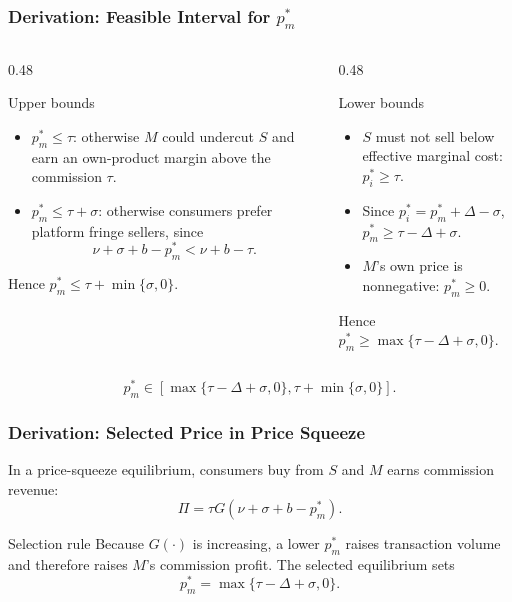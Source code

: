 \begin{frame}
  \frametitle{Derivation: Feasible Interval for $p_m^*$}
  \hypertarget{dual_pm_interval_deriv}{}
  \scriptsize

  \begin{columns}[T,onlytextwidth]
    \begin{column}{0.48\textwidth}
      \begin{block}{Upper bounds}
        \begin{itemize}
          \item $p_m^*\leq\tau$: otherwise $M$ could undercut $S$ and earn
            an own-product margin above the commission $\tau$.
          \item $p_m^*\leq\tau+\sigma$: otherwise consumers prefer platform
            fringe sellers, since
            \[
              \nu+\sigma+b-p_m^*<\nu+b-\tau.
            \]
        \end{itemize}
        Hence $p_m^*\leq\tau+\min\{\sigma,0\}$.
      \end{block}
    \end{column}

    \begin{column}{0.48\textwidth}
      \begin{block}{Lower bounds}
        \begin{itemize}
          \item $S$ must not sell below effective marginal cost:
            $p_i^*\geq\tau$.
          \item Since $p_i^*=p_m^*+\Delta-\sigma$,
            $p_m^*\geq\tau-\Delta+\sigma$.
          \item $M$'s own price is nonnegative: $p_m^*\geq0$.
        \end{itemize}
        Hence $p_m^*\geq\max\{\tau-\Delta+\sigma,0\}$.
      \end{block}
    \end{column}
  \end{columns}

  \vspace{-0.05cm}
  \[
    p_m^*\in
    \left[
      \max\{\tau-\Delta+\sigma,0\},
      \tau+\min\{\sigma,0\}
    \right].
  \]

  \hyperlink{dual_pm_interval_src}{}
\end{frame}

\begin{frame}
  \frametitle{Derivation: Selected Price in Price Squeeze}
  \footnotesize

  In a price-squeeze equilibrium, consumers buy from $S$ and $M$ earns
  commission revenue:
  \[
    \Pi=\tau G(\nu+\sigma+b-p_m^*).
  \]

  \begin{block}{Selection rule}
    Because $G(\cdot)$ is increasing, a lower $p_m^*$ raises transaction
    volume and therefore raises $M$'s commission profit. The selected
    equilibrium sets
    \[
      p_m^*=\max\{\tau-\Delta+\sigma,0\}.
    \]
  \end{block}

  \hyperlink{dual_pm_interval_src}{}
\end{frame}

